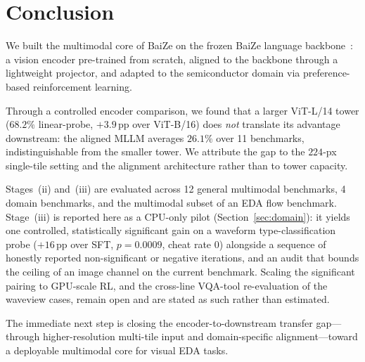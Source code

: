 ﻿\section{Conclusion}

We built the multimodal core of BaiZe on the frozen BaiZe language backbone~\cite{baiZe-llm}: a vision encoder pre-trained from scratch, aligned to the backbone through a lightweight projector, and adapted to the semiconductor domain via preference-based reinforcement learning.

Through a controlled encoder comparison, we found that a larger ViT-L/14 tower ($68.2\%$ linear-probe, $+3.9$\,pp over ViT-B/16) does \emph{not} translate its advantage downstream: the aligned MLLM averages $26.1\%$ over 11 benchmarks, indistinguishable from the smaller tower. We attribute the gap to the $224$-px single-tile setting and the alignment architecture rather than to tower capacity.

Stages~(ii) and~(iii) are evaluated across 12 general multimodal benchmarks, 4 domain benchmarks, and the multimodal subset of an EDA flow benchmark. Stage~(iii) is reported here as a CPU-only pilot (Section~\ref{sec:domain}): it yields one controlled, statistically significant gain on a waveform type-classification probe ($+16$\,pp over SFT, $p{=}0.0009$, cheat rate $0$) alongside a sequence of honestly reported non-significant or negative iterations, and an audit that bounds the ceiling of an image channel on the current benchmark. Scaling the significant pairing to GPU-scale RL, and the cross-line VQA-tool re-evaluation of the waveview cases, remain open and are stated as such rather than estimated.

The immediate next step is closing the encoder-to-downstream transfer gap---through higher-resolution multi-tile input and domain-specific alignment---toward a deployable multimodal core for visual EDA tasks.
